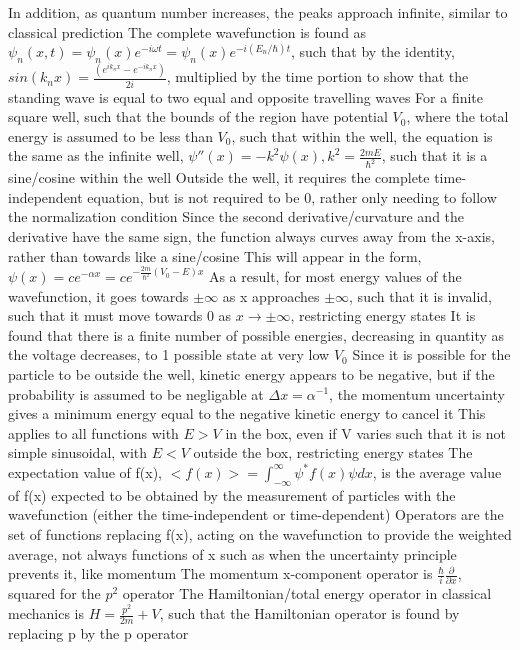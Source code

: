 \documentclass[11 pt, twoside]{article}
\newenvironment{outline*}
{
	\begin{outline}[enumerate]
	}
	{\end{outline}
}
\begin{document}
\begin{outline*}
		\3 In addition, as quantum number increases, the peaks approach infinite, similar to classical prediction
	\2 The complete wavefunction is found as $\psi_n(x, t) = \psi_n(x)e^{-i\omega t} = \psi_n(x)e^{-i(E_n/\hbar)t}$, such that by the identity, $sin(k_n x) = \frac{(e^{ik_nx} - e^{-ik_nx})}{2i}$, multiplied by the time portion to show that the standing wave is equal to two equal and opposite travelling waves
\1 For a finite square well, such that the bounds of the region have potential $V_0$, where the total energy is assumed to be less than $V_0$, such that within the well, the equation is the same as the infinite well, $\psi''(x) = -k^2\psi(x), k^2 = \frac{2mE}{\hbar^2}$, such that it is a sine/cosine within the well
	\2 Outside the well, it requires the complete time-independent equation, but is not required to be 0, rather only needing to follow the normalization condition
	\2 Since the second derivative/curvature and the derivative have the same sign, the function always curves away from the x-axis, rather than towards like a sine/cosine
		\3 This will appear in the form, $\psi(x) = ce^{-\alpha x} = ce^{-\frac{2m}{\hbar^2}(V_0 - E)x}$
		\3 As a result, for most energy values of the wavefunction, it goes towards $\pm \infty$ as x approaches $\pm \infty$, such that it is invalid, such that it must move towards 0 as $x \to \pm \infty$, restricting energy states
		\3 It is found that there is a finite number of possible energies, decreasing in quantity as the voltage decreases, to 1 possible state at very low $V_0$
	\2 Since it is possible for the particle to be outside the well, kinetic energy appears to be negative, but if the probability is assumed to be negligable at $\Delta x = \alpha^{-1}$, the momentum uncertainty gives a minimum energy equal to the negative kinetic energy to cancel it
	\2 This applies to all functions with $E > V$ in the box, even if V varies such that it is not simple sinusoidal, with $E < V$ outside the box, restricting energy states
\1 The expectation value of f(x), $<f(x)> = \int^{\infty}_{-\infty} \psi^*f(x)\psi dx$, is the average value of f(x) expected to be obtained by the measurement of particles with the wavefunction (either the time-independent or time-dependent)
	\2 Operators are the set of functions replacing f(x), acting on the wavefunction to provide the weighted average, not always functions of x such as when the uncertainty principle prevents it, like momentum
		\3 The momentum x-component operator is $\frac{\hbar}{i}\frac{\partial}{\partial x}$, squared for the $p^2$ operator
		\3 The Hamiltonian/total energy operator in classical mechanics is $H = \frac{p^2}{2m} + V$, such that the Hamiltonian operator is found by replacing p by the p operator

\end{outline*}
\end{document}
